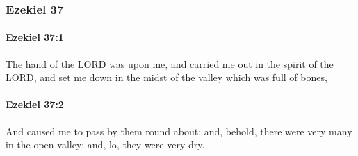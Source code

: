 	\subsubsection{Ezekiel 37} %
		\label{EZEKIEL-37}

		\paragraph{Ezekiel 37:1} %
			\label{EZEKIEL-37-1}

			The hand of the LORD was upon me, and carried me out in the spirit of the LORD, and set me down in the midst of the valley which was full of bones,


		\paragraph{Ezekiel 37:2} %
			\label{EZEKIEL-37-2}

			And caused me to pass by them round about: and, behold, there were very many in the open valley; and, lo, they were very dry.

